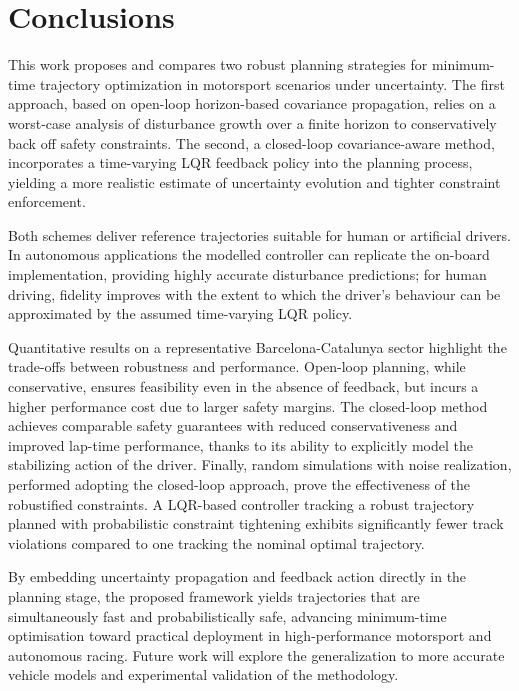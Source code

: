 \section{Conclusions}
\label{sec:conclusions}

This work proposes and compares two robust planning strategies for minimum-time trajectory optimization in motorsport scenarios under uncertainty. The first approach, based on open-loop horizon-based covariance propagation, relies on a worst-case analysis of disturbance growth over a finite horizon to conservatively back off safety constraints. The second, a closed-loop covariance-aware method, incorporates a time-varying LQR feedback policy into the planning process, yielding a more realistic estimate of uncertainty evolution and tighter constraint enforcement.

Both schemes deliver reference trajectories suitable for human or artificial drivers. In autonomous applications the modelled controller can replicate the on-board implementation, providing highly accurate disturbance predictions; for human driving, fidelity improves with the extent to which the driver's behaviour can be approximated by the assumed time-varying LQR policy.

Quantitative results on a representative Barcelona-Catalunya sector highlight the trade-offs between robustness and performance. Open-loop planning, while conservative, ensures feasibility even in the absence of feedback, but incurs a higher performance cost due to larger safety margins. The closed-loop method achieves comparable safety guarantees with reduced conservativeness and improved lap-time performance, thanks to its ability to explicitly model the stabilizing action of the driver.
Finally, random simulations with noise realization, performed adopting the closed-loop approach, prove the effectiveness of the robustified constraints. A LQR-based controller tracking a robust trajectory planned with probabilistic constraint tightening exhibits significantly fewer track violations compared to one tracking the nominal optimal trajectory.

By embedding uncertainty propagation and feedback action directly in the planning stage, the proposed framework yields trajectories that are simultaneously fast and probabilistically safe, advancing minimum-time optimisation toward practical deployment in high-performance motorsport and autonomous racing. Future work will explore the generalization to more accurate vehicle models and experimental validation of the methodology. 